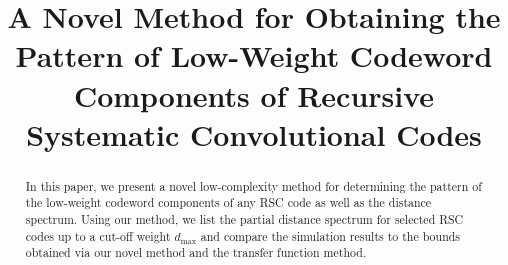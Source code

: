 \documentclass[journal,draftcls,onecolumn,12pt,twoside]{IEEEtran}
\begin{document}
\title{
A Novel Method for Obtaining the Pattern of Low-Weight Codeword Components of Recursive Systematic Convolutional Codes}
\author{%
}


\maketitle
\begin{abstract}

In this paper, we present a novel low-complexity method for determining the pattern of the low-weight codeword components of any RSC code as well as the distance spectrum. 
Using our method, we list the partial distance spectrum for selected RSC codes up to a cut-off weight $d_{\text{max}}$ and compare the simulation results to the bounds obtained via our novel method and the transfer function method. 
\end{abstract}
\newpage
%

\newpage
%

\newpage
%
%
%
%
%
\end{document}
